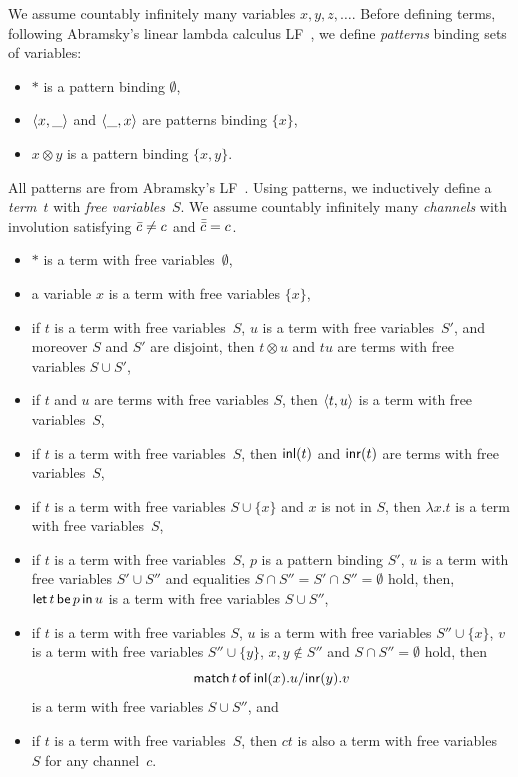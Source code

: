 We assume countably infinitely many variables $x, y, z, \ldots$.
Before defining terms, following Abramsky's linear lambda calculus
LF~\citep{abramsky1993computational}, we define \textit{patterns}
binding sets of variables:
\begin{itemize}
 \item $\ast$ is a pattern binding $\emptyset$,
 \item $\langle{x,\_}\rangle$ and $\langle{\_,x}\rangle$ are patterns binding $\{x\}$,
 \item $x\otimes y$ is a pattern binding $\{x,y\}$.
\end{itemize}
All patterns are from Abramsky's LF~\citep{abramsky1993computational}.
Using patterns, we inductively define a \textit{term}~$t$
with \textit{free variables}~$S$.
We assume countably infinitely many \textit{channels}
with involution satisfying $\bar{c}\neq c$ and $\bar{\bar{c}} = c$.
\begin{itemize}
 \item $\ast$ is a term with free variables~$\emptyset$,
 \item a variable $x$ is a term with free variables $\{x\}$,
 \item if $t$ is a term with free variables~$S$, $u$ is a term with
       free variables~$S'$, and moreover $S$ and $S'$ are disjoint, then $t\otimes
       u$ and
       $tu$ are terms with free variables $S\cup S'$,
 \item if $t$ and $u$ are terms with free variables $S$, then
       $\langle{t,u}\rangle$ is a term with free variables~$S$,
 \item if $t$ is a term with free variables~$S$, then
       $\mathsf{inl}({t})$ and $\mathsf{inr}({t})$ are terms with free variables~$S$,
 \item if $t$ is a term with free variables $S\cup \{x\}$ and $x$ is not
       in $S$, then $\lambda x.t$ is a term with free variables~$S$,
 \item if $t$ is a term with free variables~$S$, $p$ is a pattern
       binding $S'$, $u$ is a term with free variables $S'\cup S''$ and equalities
       $S\cap S'' = S'\cap S'' = \emptyset$ hold, then,
       $\mathsf{let }\,{t}\,\mathsf{ be }\,{p}\,\mathsf{ in }\,{u}$ is a term with free variables $S\cup S''$,
 \item if $t$ is a term with free variables $S$,
       $u$ is a term with free variables $S''\cup \{x\}$,
       $v$ is a term with free variables $S''\cup \{y\}$,
       $x,y\notin S''$ and $S\cap S'' = \emptyset$ hold, then
       \[
	\mathsf{match}\,{t}\,\mathsf{of}\, \mathsf{inl}({x}). {u}/ \mathsf{inr}({y}). {v}
       \]
       is a term with free variables $S\cup S''$, and
 \item if $t$ is a term with free variables~$S$,
       then $ct$ is also a term with free variables~$S$ for any channel~$c$.
\end{itemize}
